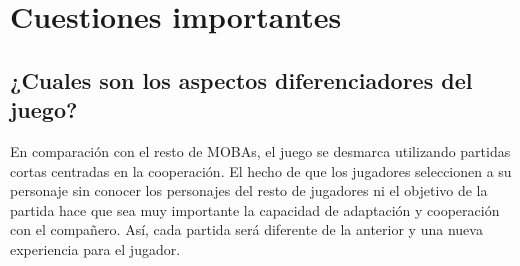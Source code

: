 \section{Cuestiones importantes}


\subsection{¿Cuales son los aspectos diferenciadores del juego?}
En comparación con el resto de MOBAs, el juego se desmarca utilizando partidas cortas centradas en la cooperación. El hecho de que los jugadores seleccionen a su personaje sin conocer los personajes del resto de jugadores ni el objetivo de la partida hace que sea muy importante la capacidad de adaptación y cooperación con el compañero. Así, cada partida será diferente de la anterior y una nueva experiencia para el jugador.
	

